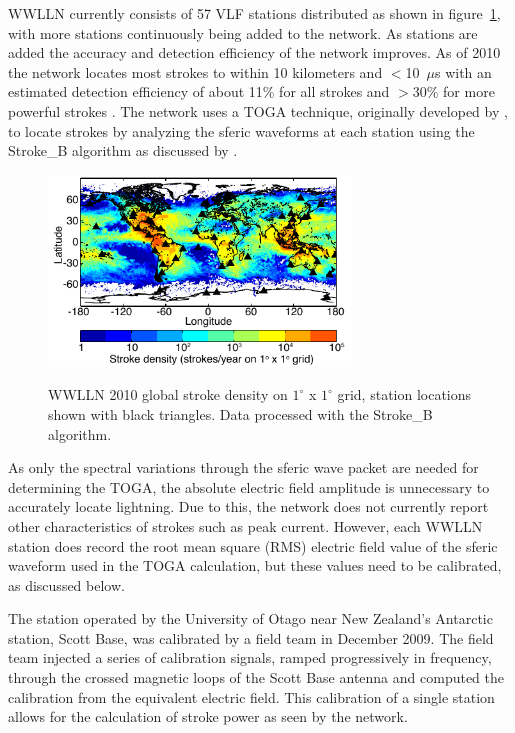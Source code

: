 WWLLN currently consists of 57 VLF stations distributed as shown in figure~\ref{wwlln_dist}, with more stations continuously being added to the network.
As stations are added the accuracy and detection efficiency of the network improves. As of 2010 the network locates most strokes to within 10 kilometers and $<$10~$\mu$s with an estimated detection efficiency of about 11\% for all strokes and $>$30\% for more powerful strokes \citep{Abarca2010,Rodger2009}.
The network uses a TOGA technique, originally developed by \citet{Dowden2000}, to locate strokes by analyzing the sferic waveforms at each station using the Stroke\_B algorithm as discussed by \citet{Rodger2006,Rodger2009}.

 \begin{figure}[b]
 \noindent\includegraphics[width=19pc,angle=0]{energy/Figures/PPS_WWLLN_2010.pdf}\\
 \caption{WWLLN 2010 global stroke density on $1^\circ$ x $1^\circ$ grid, station locations shown with black triangles. Data processed with the Stroke\_B algorithm.}
 \label{wwlln_dist}
 \end{figure}

As only the spectral variations through the sferic wave packet are needed for determining the TOGA, the absolute electric field amplitude is unnecessary to accurately locate lightning. Due to this, the network does not currently report other characteristics of strokes such as peak current.
However, each WWLLN station does record the root mean square (RMS) electric field value of the sferic waveform used in the TOGA calculation, but these values need to be calibrated, as discussed below.

The station operated by the University of Otago near New Zealand's Antarctic station, Scott Base, was calibrated by a field team in December 2009.
The field team injected a series of calibration signals, ramped progressively in frequency, through the crossed magnetic loops of the Scott Base antenna and computed the calibration from the equivalent electric field.
This calibration of a single station allows for the calculation of stroke power as seen by the network.

